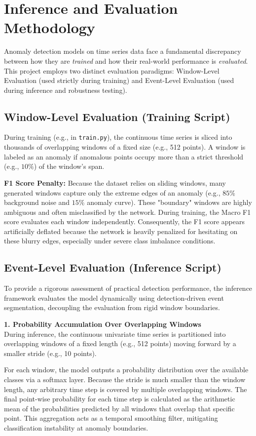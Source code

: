 \section{Inference and Evaluation Methodology}

Anomaly detection models on time series data face a fundamental discrepancy between how they are \textit{trained} and how their real-world performance is \textit{evaluated}. This project employs two distinct evaluation paradigms: Window-Level Evaluation (used strictly during training) and Event-Level Evaluation (used during inference and robustness testing).

\subsection{Window-Level Evaluation (Training Script)}
During training (e.g., in \texttt{train.py}), the continuous time series is sliced into thousands of overlapping windows of a fixed size (e.g., 512 points). A window is labeled as an anomaly if anomalous points occupy more than a strict threshold (e.g., $10\%$) of the window's span.

\textbf{F1 Score Penalty:} 
Because the dataset relies on sliding windows, many generated windows capture only the extreme edges of an anomaly (e.g., $85\%$ background noise and $15\%$ anomaly curve). These "boundary" windows are highly ambiguous and often misclassified by the network. During training, the Macro F1 score evaluates each window independently. Consequently, the F1 score appears artificially deflated because the network is heavily penalized for hesitating on these blurry edges, especially under severe class imbalance conditions.

\subsection{Event-Level Evaluation (Inference Script)}
To provide a rigorous assessment of practical detection performance, the inference framework evaluates the model dynamically using detection-driven event segmentation, decoupling the evaluation from rigid window boundaries.

\textbf{1. Probability Accumulation Over Overlapping Windows} \\
During inference, the continuous univariate time series is partitioned into overlapping windows of a fixed length (e.g., 512 points) moving forward by a smaller stride (e.g., 10 points). 

For each window, the model outputs a probability distribution over the available classes via a softmax layer. Because the stride is much smaller than the window length, any arbitrary time step is covered by multiple overlapping windows. The final point-wise probability for each time step is calculated as the arithmetic mean of the probabilities predicted by all windows that overlap that specific point. This aggregation acts as a temporal smoothing filter, mitigating classification instability at anomaly boundaries.

